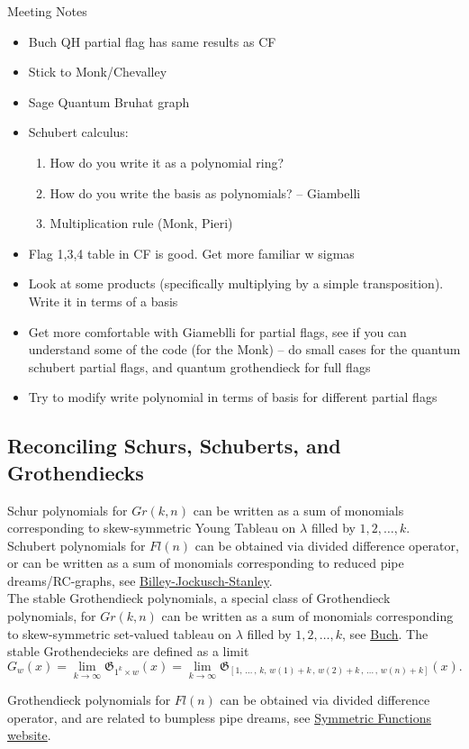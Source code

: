 Meeting Notes
\begin{itemize}
    \item Buch QH partial flag has same results as CF
    \item Stick to Monk/Chevalley
    \item Sage Quantum Bruhat graph
    \item Schubert calculus: 
    \begin{enumerate}
        \item How do you write it as a polynomial ring?
        \item How do you write the basis as polynomials? -- Giambelli
        \item Multiplication rule (Monk, Pieri)
    \end{enumerate}
    \item Flag 1,3,4 table in CF is good. Get more familiar w sigmas
    \item Look at some products (specifically multiplying by a simple transposition). Write it in terms of a basis 
    \item Get more comfortable with Giameblli for partial flags, see if you can understand some of the code (for the Monk) -- do small cases for the quantum schubert partial flags, and quantum grothendieck for full flags
    \item Try to modify write polynomial in terms of basis for different partial flags
\end{itemize}

\subsection{Reconciling Schurs, Schuberts, and Grothendiecks}

Schur polynomials for $Gr(k,n)$ can be written as a sum of monomials corresponding to skew-symmetric Young Tableau on $\lambda$ filled by $1, 2, \dots, k$. \\

Schubert polynomials for $Fl(n)$ can be obtained via divided difference operator, or can be written as a sum of monomials corresponding to reduced pipe dreams/RC-graphs, see \href{https://sites.math.washington.edu/~billey/papers/bjs.pdf}{Billey-Jockusch-Stanley}. \\

The stable Grothendieck polynomials, a special class of Grothendieck polynomials, for $Gr(k,n)$ can be written as a sum of monomials corresponding to skew-symmetric set-valued tableau on $\lambda$ filled by $1, 2, \dots, k$, see 
\href{https://sites.math.rutgers.edu/~asbuch/papers/combkth.pdf}{Buch}. The stable Grothendecieks are defined as a limit
\[ 
    G_w(x) = \lim\limits_{k \rightarrow \infty}\mathfrak{G}_{1^k \times w}(x) = \lim\limits_{k \rightarrow \infty}\mathfrak{G}_{[1, \, \dots \,, \, k, \, w(1) + k \,, \,w(2) + k \,, \, \dots \,, \,w(n)+ k]}(x).
\]

Grothendieck polynomials for $Fl(n)$ can be obtained via divided difference operator, and are related to bumpless pipe dreams, see \href{https://www.symmetricfunctions.com/grothendieck.htm}{Symmetric Functions website}.
